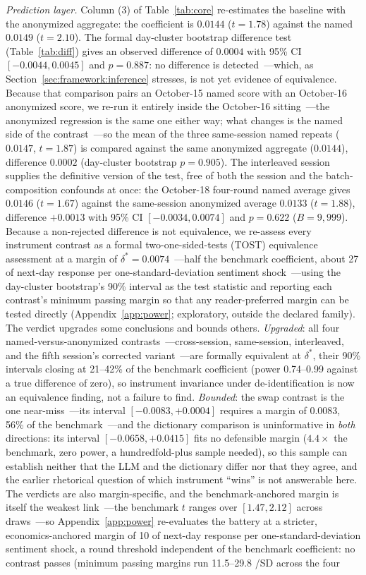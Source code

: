 \emph{Prediction layer.} Column (3) of Table~\ref{tab:core} re-estimates the baseline with the anonymized aggregate: the coefficient is $0.0144$ ($t=1.78$) against the named $0.0149$ ($t=2.10$). The formal day-cluster bootstrap difference test (Table~\ref{tab:diff}) gives an observed difference of $0.0004$ with 95\% CI $[-0.0044, 0.0045]$ and $p=0.887$: no difference is detected~---which, as Section~\ref{sec:framework:inference} stresses, is not yet evidence of equivalence. Because that comparison pairs an October-15 named score with an October-16 anonymized score, we re-run it entirely inside the October-16 sitting~---the anonymized regression is the same one either way; what changes is the named side of the contrast~---so the mean of the three same-session named repeats ($0.0147$, $t=1.87$) is compared against the same anonymized aggregate ($0.0144$), difference $0.0002$ (day-cluster bootstrap $p=0.905$). The interleaved session supplies the definitive version of the test, free of both the session and the batch-composition confounds at once: the October-18 four-round named average gives $0.0146$ ($t=1.67$) against the same-session anonymized average $0.0133$ ($t=1.88$), difference $+0.0013$ with 95\% CI $[-0.0034, 0.0074]$ and $p=0.622$ ($B=9{,}999$). Because a non-rejected difference is not equivalence, we re-assess every instrument contrast as a formal two-one-sided-tests (TOST) equivalence assessment at a margin of $\delta^{*}=0.0074$~---half the benchmark coefficient, about 27 \bps{} of next-day response per one-standard-deviation sentiment shock~---using the day-cluster bootstrap's 90\% interval as the test statistic and reporting each contrast's minimum passing margin so that any reader-preferred margin can be tested directly (Appendix~\ref{app:power}; exploratory, outside the declared family). The verdict upgrades some conclusions and bounds others. \emph{Upgraded}: all four named-versus-anonymized contrasts~---cross-session, same-session, interleaved, and the fifth session's corrected variant~---are formally equivalent at $\delta^{*}$, their 90\% intervals closing at 21--42\% of the benchmark coefficient (power 0.74--0.99 against a true difference of zero), so instrument invariance under de-identification is now an equivalence finding, not a failure to find. \emph{Bounded}: the swap contrast is the one near-miss~---its interval $[-0.0083, +0.0004]$ requires a margin of 0.0083, 56\% of the benchmark~---and the dictionary comparison is uninformative in \emph{both} directions: its interval $[-0.0658, +0.0415]$ fits no defensible margin ($4.4\times$ the benchmark, zero power, a hundredfold-plus sample needed), so this sample can establish neither that the LLM and the dictionary differ nor that they agree, and the earlier rhetorical question of which instrument ``wins'' is not answerable here. The verdicts are also margin-specific, and the benchmark-anchored margin is itself the weakest link~---the benchmark $t$ ranges over $[1.47, 2.12]$ across draws~---so Appendix~\ref{app:power} re-evaluates the battery at a stricter, economics-anchored margin of 10 \bps{} of next-day response per one-standard-deviation sentiment shock, a round threshold independent of the benchmark coefficient: no contrast passes (minimum passing margins run 11.5--29.8 \bps/SD across the four 